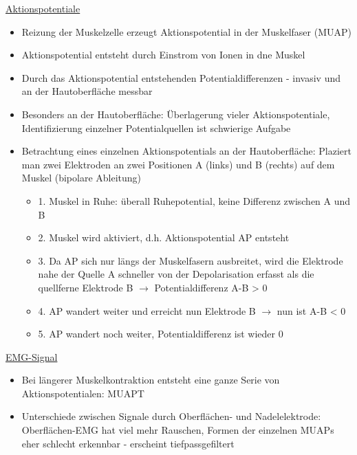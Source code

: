 \documentclass[a4paper,10pt,oneside]{article}
\begin{document}
\underline{Aktionspotentiale} \\
	\begin{itemize}
		\item Reizung der Muskelzelle erzeugt Aktionspotential in der Muskelfaser (MUAP)
		\item Aktionspotential entsteht durch Einstrom von Ionen in dne Muskel
		\item Durch das Aktionspotential entstehenden Potentialdifferenzen - invasiv und an der Hautoberfläche messbar
		\item Besonders an der Hautoberfläche: Überlagerung vieler Aktionspotentiale, Identifizierung einzelner Potentialquellen ist schwierige Aufgabe
		\item Betrachtung eines einzelnen Aktionspotentials an der Hautoberfläche: Plaziert man zwei Elektroden an zwei Positionen A (links) und B (rechts) auf dem Muskel (bipolare Ableitung)
			\begin{itemize}
				\item 1. Muskel in Ruhe: überall Ruhepotential, keine Differenz zwischen A und B
				\item 2. Muskel wird aktiviert, d.h. Aktionspotential AP entsteht
				\item 3. Da AP sich nur längs der Muskelfasern ausbreitet, wird die Elektrode nahe der Quelle A schneller von der Depolarisation erfasst als die quellferne Elektrode B $\rightarrow$ Potentialdifferenz A-B > 0
				\item 4. AP wandert weiter und erreicht nun Elektrode B $\rightarrow$ nun ist A-B < 0
				\item 5. AP wandert noch weiter, Potentialdifferenz ist wieder 0
			\end{itemize}
	\end{itemize}

\underline{EMG-Signal} \\
	\begin{itemize}
		\item Bei längerer Muskelkontraktion entsteht eine ganze Serie von Aktionspotentialen: MUAPT
		\item Unterschiede zwischen Signale durch Oberflächen- und Nadelelektrode: Oberflächen-EMG hat viel mehr Rauschen, Formen der einzelnen MUAPs eher schlecht erkennbar - erscheint tiefpassgefiltert
	\end{itemize}
	
\end{document}
